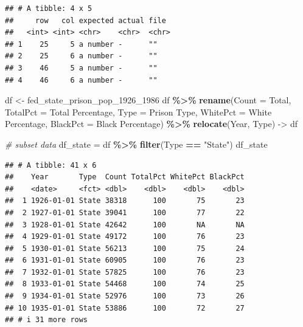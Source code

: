 \documentclass[
]{article}
\newenvironment{Shaded}{\begin{snugshade}}{\end{snugshade}}
\newcommand{\AttributeTok}[1]{\textcolor[rgb]{0.13,0.29,0.53}{#1}}
\newcommand{\CommentTok}[1]{\textcolor[rgb]{0.56,0.35,0.01}{\textit{#1}}}
\newcommand{\FunctionTok}[1]{\textcolor[rgb]{0.13,0.29,0.53}{\textbf{#1}}}
\newcommand{\NormalTok}[1]{#1}
\newcommand{\OtherTok}[1]{\textcolor[rgb]{0.56,0.35,0.01}{#1}}
\newcommand{\SpecialCharTok}[1]{\textcolor[rgb]{0.81,0.36,0.00}{\textbf{#1}}}
\newcommand{\StringTok}[1]{\textcolor[rgb]{0.31,0.60,0.02}{#1}}
\begin{document}
\begin{verbatim}
## # A tibble: 4 x 5
##     row   col expected actual file 
##   <int> <int> <chr>    <chr>  <chr>
## 1    25     5 a number -      ""   
## 2    25     6 a number -      ""   
## 3    46     5 a number -      ""   
## 4    46     6 a number -      ""
\end{verbatim}

\begin{Shaded}
\begin{Highlighting}[]
\NormalTok{df }\OtherTok{\textless{}{-}}\NormalTok{ fed\_state\_prison\_pop\_1926\_1986}
\NormalTok{df }\SpecialCharTok{\%\textgreater{}\%} 
  \FunctionTok{rename}\NormalTok{(}\AttributeTok{Count =} \StringTok{\textasciigrave{}}\AttributeTok{Total}\StringTok{\textasciigrave{}}\NormalTok{,}
         \AttributeTok{TotalPct =} \StringTok{\textasciigrave{}}\AttributeTok{Total Percentage}\StringTok{\textasciigrave{}}\NormalTok{,}
         \AttributeTok{Type =} \StringTok{\textasciigrave{}}\AttributeTok{Prison Type}\StringTok{\textasciigrave{}}\NormalTok{,}
         \AttributeTok{WhitePct =} \StringTok{\textasciigrave{}}\AttributeTok{White Percentage}\StringTok{\textasciigrave{}}\NormalTok{,}
         \AttributeTok{BlackPct =} \StringTok{\textasciigrave{}}\AttributeTok{Black Percentage}\StringTok{\textasciigrave{}}\NormalTok{) }\SpecialCharTok{\%\textgreater{}\%} 
  \FunctionTok{relocate}\NormalTok{(Year, Type) }\OtherTok{{-}\textgreater{}}\NormalTok{ df}
\end{Highlighting}
\end{Shaded}

\begin{Shaded}
\begin{Highlighting}[]
\CommentTok{\# subset data}
\NormalTok{df\_state }\OtherTok{=}\NormalTok{ df }\SpecialCharTok{\%\textgreater{}\%} \FunctionTok{filter}\NormalTok{(Type }\SpecialCharTok{==} \StringTok{"State"}\NormalTok{)}
\NormalTok{df\_state}
\end{Highlighting}
\end{Shaded}

\begin{verbatim}
## # A tibble: 41 x 6
##    Year       Type  Count TotalPct WhitePct BlackPct
##    <date>     <fct> <dbl>    <dbl>    <dbl>    <dbl>
##  1 1926-01-01 State 38318      100       75       23
##  2 1927-01-01 State 39041      100       77       22
##  3 1928-01-01 State 42642      100       NA       NA
##  4 1929-01-01 State 49172      100       76       23
##  5 1930-01-01 State 56213      100       75       24
##  6 1931-01-01 State 60905      100       76       23
##  7 1932-01-01 State 57825      100       76       23
##  8 1933-01-01 State 54468      100       74       25
##  9 1934-01-01 State 52976      100       73       26
## 10 1935-01-01 State 53886      100       72       27
## # i 31 more rows
\end{verbatim}
\end{document}
